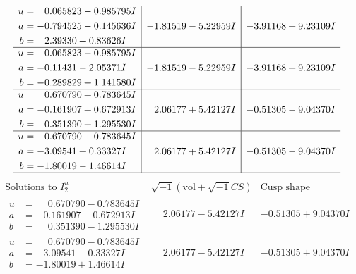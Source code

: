 \documentclass[1p]{elsarticle_modified}
\theoremstyle{definition}
\newcommand{\I}{\sqrt{-1}}
\begin{document}
$$\begin{array}{c|c|c}
\begin{aligned}
u &= \phantom{-}0.065823 - 0.985795 I \\
a &= -0.794525 - 0.145636 I \\
b &= \phantom{-}2.39330 + 0.83626 I\end{aligned}
 & -1.81519 - 5.22959 I & -3.91168 + 9.23109 I \\ \hline\begin{aligned}
u &= \phantom{-}0.065823 - 0.985795 I \\
a &= -0.11431 - 2.05371 I \\
b &= -0.289829 + 1.141580 I\end{aligned}
 & -1.81519 - 5.22959 I & -3.91168 + 9.23109 I \\ \hline\begin{aligned}
u &= \phantom{-}0.670790 + 0.783645 I \\
a &= -0.161907 + 0.672913 I \\
b &= \phantom{-}0.351390 + 1.295530 I\end{aligned}
 & \phantom{-}2.06177 + 5.42127 I & -0.51305 - 9.04370 I \\ \hline\begin{aligned}
u &= \phantom{-}0.670790 + 0.783645 I \\
a &= -3.09541 + 0.33327 I \\
b &= -1.80019 - 1.46614 I\end{aligned}
 & \phantom{-}2.06177 + 5.42127 I & -0.51305 - 9.04370 I\\
 \hline 
 \end{array}$$\newpage$$\begin{array}{c|c|c}  
\text{Solutions to }I^u_{2}& \I (\text{vol} + \sqrt{-1}CS) & \text{Cusp shape}\\
 \hline 
\begin{aligned}
u &= \phantom{-}0.670790 - 0.783645 I \\
a &= -0.161907 - 0.672913 I \\
b &= \phantom{-}0.351390 - 1.295530 I\end{aligned}
 & \phantom{-}2.06177 - 5.42127 I & -0.51305 + 9.04370 I \\ \hline\begin{aligned}
u &= \phantom{-}0.670790 - 0.783645 I \\
a &= -3.09541 - 0.33327 I \\
b &= -1.80019 + 1.46614 I\end{aligned}
 & \phantom{-}2.06177 - 5.42127 I & -0.51305 + 9.04370 I \\ \hline\begin{aligned}

\end{aligned}
\end{array}$$
\end{document}
